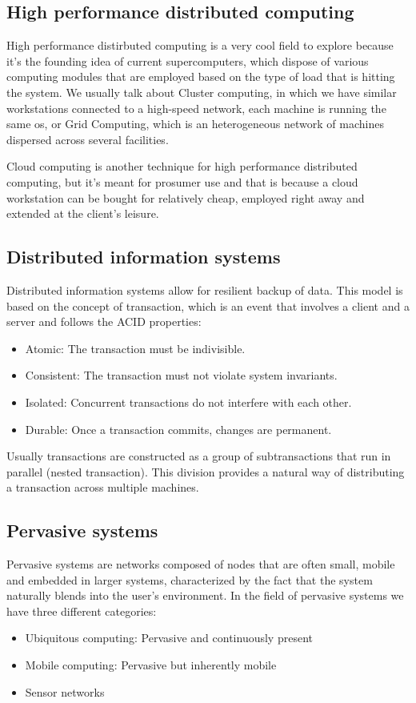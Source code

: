 \subsection{High performance distributed computing}
High performance distirbuted computing is a very cool field to explore because it's the founding idea of current supercomputers, which dispose of various computing modules that are employed based on the type of load that is hitting the system. We usually talk about Cluster computing, in which we have similar workstations connected to a high-speed network, each machine is running the same os, or Grid Computing, which is an heterogeneous network of machines dispersed across several facilities.

Cloud computing is another technique for high performance distributed computing, but it's meant for prosumer use and that is because a cloud workstation can be bought for relatively cheap, employed right away and extended at the client's leisure.
\subsection{Distributed information systems}
Distributed information systems allow for resilient backup of data. This model is based on the concept of transaction, which is an event that involves a client and a server and follows the ACID properties:
\begin{itemize}
	\item Atomic: The transaction must be indivisible.
	\item Consistent: The transaction must not violate system invariants.
	\item Isolated: Concurrent transactions do not interfere with each other.
	\item Durable: Once a transaction commits, changes are permanent.
\end{itemize}
Usually transactions are constructed as a group of subtransactions that run in parallel (nested transaction). This division provides a natural way of distributing a transaction across multiple machines.
\subsection{Pervasive systems}
Pervasive systems are networks composed of nodes that are often small, mobile and embedded in larger systems, characterized by the fact that the system naturally blends into the user's environment. In the field of pervasive systems we have three different categories:
\begin{itemize}
	\item Ubiquitous computing: Pervasive and continuously present
	\item Mobile computing: Pervasive but inherently mobile
	\item Sensor networks
\end{itemize}
